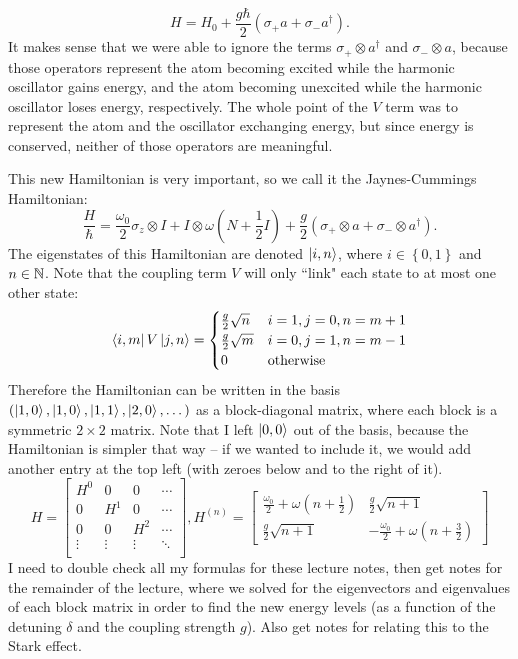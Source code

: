 \documentclass{article}
\begin{document}
\[ H = H_0 + \frac{g\hbar}{2} \left( \sigma_+ a + \sigma_- a^\dag \right).  \]
It makes sense that we were able to ignore the terms $\sigma_+ \otimes a^\dag$ and $\sigma_- \otimes a$, because those operators represent the atom becoming excited while the harmonic oscillator gains energy, and the atom becoming unexcited while the harmonic oscillator loses energy, respectively. The whole point of the $V$ term was to represent the atom and the oscillator exchanging energy, but since energy is conserved, neither of those operators are meaningful.
\par
This new Hamiltonian is very important, so we call it the Jaynes-Cummings Hamiltonian:
\[ \frac{H}{\hbar} = \frac{\omega_0}{2} \sigma_z \otimes I + I \otimes \omega \left( N + \frac{1}{2} I \right) + \frac{g}{2} \left( \sigma_+ \otimes a + \sigma_- \otimes a^\dag \right). \]
The eigenstates of this Hamiltonian are denoted $\left\lvert i,n \right\rangle$, where $i \in \left\{ 0,1 \right\}$ and $n \in \mathbb{N}$. Note that the coupling term $V$ will only ``link" each state to at most one other state:
\[ \left\langle i,m \right\rvert V \left\lvert j, n \right\rangle = \begin{cases}
    \frac{g}{2} \sqrt{n} & i=1, j=0, n=m+1 \\
    \frac{g}{2} \sqrt{m} & i=0, j=1, n=m-1 \\
    0 & \text{otherwise}
\end{cases} \]
Therefore the Hamiltonian can be written in the basis $ \left( \left\lvert 1,0 \right\rangle, \left\lvert 1,0 \right\rangle, \left\lvert 1,1 \right\rangle, \left\lvert 2,0 \right\rangle,\dots \right)$ as a block-diagonal matrix, where each block is a symmetric $2 \times 2$ matrix. Note that I left $\left\lvert 0,0 \right\rangle$ out of the basis, because the Hamiltonian is simpler that way -- if we wanted to include it, we would add another entry at the top left (with zeroes below and to the right of it).
\[ H = \begin{bmatrix}
    H^{0} & 0 & 0 & \cdots \\
    0 & H^{1} & 0 & \cdots \\
    0 & 0 & H^{2} & \cdots \\
    \vdots & \vdots & \vdots & \ddots \\
\end{bmatrix}, H^{(n)} = \begin{bmatrix}
    \frac{\omega_0}{2} + \omega \left( n + \frac{1}{2} \right) & \frac{g}{2} \sqrt{n+1} \\
    \frac{g}{2} \sqrt{n+1} & - \frac{\omega_0}{2} + \omega \left( n + \frac{3}{2} \right)
\end{bmatrix} \]
I need to double check all my formulas for these lecture notes, then get notes for the remainder of the lecture, where we solved for the eigenvectors and eigenvalues of each block matrix in order to find the new energy levels (as a function of the detuning $\delta$ and the coupling strength $g$). Also get notes for relating this to the Stark effect.
\end{document}
